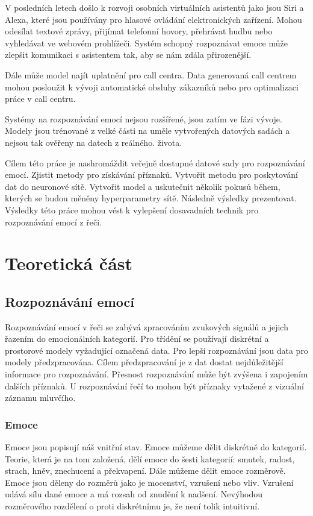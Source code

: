\documentclass[FM,BP]{tulthesis}
\begin{document}
V posledních letech došlo k rozvoji osobních virtuálních asistentů jako jsou Siri a Alexa, které jsou používány pro hlasové ovládání elektronických zařízení. Mohou odesílat textové zprávy, přijímat telefonní hovory, přehrávat hudbu nebo vyhledávat ve webovém prohlížeči. Systém schopný rozpoznávat emoce může zlepšit komunikaci s asistentem tak, aby se nám zdála přirozenější.\cite{DBLP:journals/corr/abs-1912-10458} 

Dále může model najít uplatnění pro call centra. Data generovaná call centrem mohou posloužit k vývoji automatické obsluhy zákazníků nebo pro optimalizaci práce v call centru. \cite{konar_chakraborty_2015}

Systémy na rozpoznávání emocí nejsou rozšířené, jsou zatím ve fázi vývoje. Modely jsou trénované z velké části na uměle vytvořených datových sadách a nejsou tak ověřeny na datech z reálného. života.\cite{konar_chakraborty_2015}

Cílem této práce je nashromáždit veřejně dostupné datové sady pro rozpoznávání emocí. Zjistit metody pro získávání příznaků. Vytvořit metodu pro poskytování dat do neuronové sítě. Vytvořit model a uskutečnit několik pokusů během, kterých se budou měněny hyperparametry sítě. Následně výsledky prezentovat. Výsledky této práce mohou vést k vylepšení dosavadních technik pro rozpoznávání emocí z řeči. 

\chapter{Teoretická část}
\section{Rozpoznávání emocí}
Rozpoznávání emocí v řeči se zabývá zpracováním zvukových signálů a jejich řazením do emocionálních kategorií. Pro třídění se používají diskrétní a prostorové modely vyžadující označená data. Pro lepší rozpoznávání jsou data pro modely předzpracována. Cílem předzpracování je z dat dostat nejdůležitější informace pro rozpoznávání. Přesnost rozpoznávání může být zvýšena i zapojením dalších příznaků. U rozpoznávání řečí to mohou být příznaky vytažené z vizuální záznamu mluvčího.\cite{DBLP:journals/speech/AkcayO20}

\subsection{Emoce}
Emoce jsou popisují náš vnitřní stav. Emoce můžeme dělit diskrétně do kategorií. Teorie, která je na tom založená, dělí emoce do šesti kategorií: smutek, radost, strach, hněv, znechucení a překvapení. Dále můžeme dělit emoce rozměrově. Emoce jsou děleny do rozměrů jako je mocenství, vzrušení nebo vliv. Vzrušení udává sílu dané emoce a má rozsah od znudění k nadšení. Nevýhodou rozměrového rozdělení o proti diskrétnímu je, že není tolik intuitivní.\cite{DBLP:journals/speech/AkcayO20}
\end{document}
